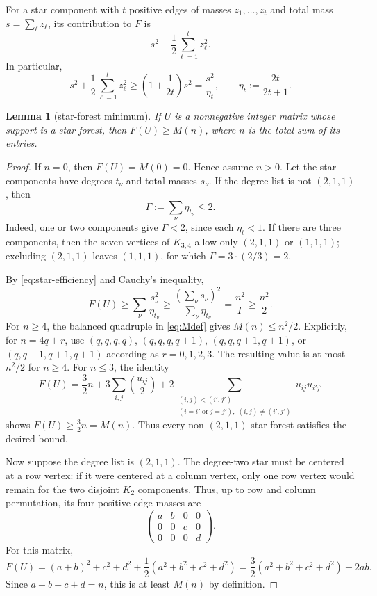 \documentclass[12pt]{article}
\theoremstyle{plain}
\newtheorem{lemma}[theorem]{Lemma}
\theoremstyle{definition}
\theoremstyle{remark}
\begin{document}
For a star component with \(t\) positive edges of masses
\(z_1,\ldots,z_t\) and total mass \(s=\sum_\ell z_\ell\), its contribution to
\(F\) is
\begin{equation}\label{eq:star-cost}
  s^2+\frac12\sum_{\ell=1}^t z_\ell^2.
\end{equation}
In particular,
\begin{equation}\label{eq:star-efficiency}
  s^2+\frac12\sum_{\ell=1}^t z_\ell^2
  \ge \left(1+\frac1{2t}\right)s^2
  =\frac{s^2}{\eta_t},
  \qquad
  \eta_t:=\frac{2t}{2t+1}.
\end{equation}

\begin{lemma}[star-forest minimum]\label{lem:star-forest}
If \(U\) is a nonnegative integer matrix whose support is a star forest, then
\(F(U)\ge M(n)\), where \(n\) is the total sum of its entries.
\end{lemma}

\begin{proof}
If \(n=0\), then \(F(U)=M(0)=0\).  Hence assume \(n>0\).  Let the star
components have degrees \(t_\nu\) and total masses \(s_\nu\).  If the degree
list is not \((2,1,1)\), then
\begin{equation}\label{eq:Gamma-bound}
  \Gamma:=\sum_\nu \eta_{t_\nu}\le2.
\end{equation}
Indeed, one or two components give \(\Gamma<2\), since each \(\eta_t<1\).  If
there are three components, then the seven vertices of \(K_{3,4}\) allow only
\((2,1,1)\) or \((1,1,1)\); excluding \((2,1,1)\) leaves \((1,1,1)\), for
which \(\Gamma=3\cdot(2/3)=2\).

By \eqref{eq:star-efficiency} and Cauchy's inequality,
\[
  F(U)\ge\sum_\nu\frac{s_\nu^2}{\eta_{t_\nu}}
  \ge\frac{(\sum_\nu s_\nu)^2}{\sum_\nu\eta_{t_\nu}}
  =\frac{n^2}{\Gamma}
  \ge\frac{n^2}{2}.
\]
For \(n\ge4\), the balanced quadruple in \eqref{eq:Mdef} gives
\(M(n)\le n^2/2\).  Explicitly, for \(n=4q+r\), use
\((q,q,q,q)\), \((q,q,q,q+1)\), \((q,q,q+1,q+1)\), or
\((q,q+1,q+1,q+1)\) according as \(r=0,1,2,3\).  The resulting value is at
most \(n^2/2\) for \(n\ge4\).  For \(n\le3\), the identity
\[
  F(U)=\frac32n
      +3\sum_{i,j}\binom{u_{ij}}2
      +2\sum_{\substack{(i,j)<(i',j')\\
             (i=i'\;\text{or}\;j=j'),\;(i,j)\ne(i',j')}}u_{ij}u_{i'j'}
\]
shows \(F(U)\ge\frac32n=M(n)\).  Thus every non-\((2,1,1)\) star forest
satisfies the desired bound.

Now suppose the degree list is \((2,1,1)\).  The degree-two star must be
centered at a row vertex: if it were centered at a column vertex, only one row
vertex would remain for the two disjoint \(K_2\) components.  Thus, up to row
and column permutation, its four positive edge masses are
\[
  \begin{pmatrix}
  a&b&0&0\\
  0&0&c&0\\
  0&0&0&d
  \end{pmatrix}.
\]
For this matrix,
\[
  F(U)=(a+b)^2+c^2+d^2+\frac12(a^2+b^2+c^2+d^2)
  =\frac32(a^2+b^2+c^2+d^2)+2ab.
\]
Since \(a+b+c+d=n\), this is at least \(M(n)\) by definition.
\end{proof}
\end{document}
